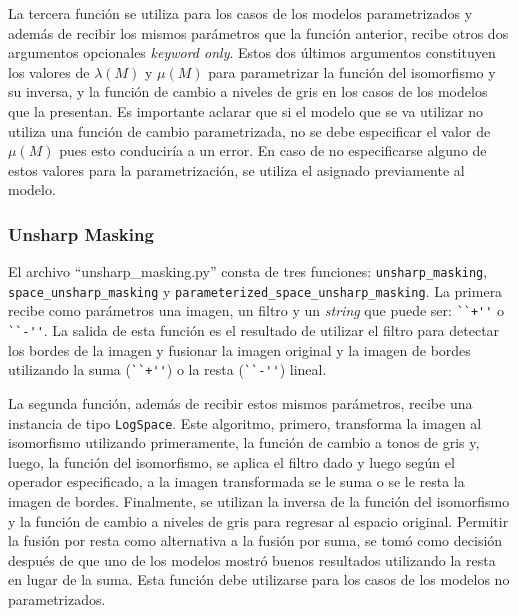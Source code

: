La tercera funci\'on se utiliza para los casos de los modelos parametrizados y adem\'as de recibir los mismos par\'ametros que la funci\'on anterior, recibe otros dos argumentos opcionales \textit{keyword only}. Estos dos \'ultimos argumentos constituyen los valores de $\lambda(M)$ y $\mu(M)$ para parametrizar la funci\'on del isomorfismo y su inversa, y la funci\'on de cambio a niveles de gris en los casos de los modelos que la presentan. Es importante aclarar que si el modelo que se va utilizar no utiliza una funci\'on de cambio parametrizada, no se debe especificar el valor de $\mu(M)$ pues esto conducir\'ia a un error.  En caso de no especificarse alguno de estos valores para la parametrizaci\'on, se utiliza el asignado previamente al modelo.

\subsubsection{Unsharp Masking}

El archivo ``unsharp\_masking.py'' consta de tres funciones: \verb|unsharp_masking|, \verb|space_unsharp_masking| y \verb|parameterized_space_unsharp_masking|. La primera recibe como par\'ametros una imagen, un filtro y un \textit{string} que puede ser: \verb|``+''| o \verb|``-''|. La salida de esta funci\'on es el resultado de utilizar el filtro para detectar los bordes de la imagen y fusionar la imagen original y la imagen de bordes utilizando la suma (\verb|``+''|) o la resta (\verb|``-''|) lineal. 

La segunda funci\'on, adem\'as de recibir estos mismos par\'ametros, recibe una instancia de tipo \verb|LogSpace|. Este algoritmo, primero, transforma la imagen al isomorfismo utilizando primeramente, la funci\'on de cambio a tonos de gris y, luego, la funci\'on del isomorfismo, se aplica el filtro dado y luego seg\'un el operador especificado, a la imagen transformada se le suma o se le resta la imagen de bordes. Finalmente, se utilizan la inversa de la funci\'on del isomorfismo y la funci\'on de cambio a niveles de gris para regresar al espacio original. Permitir la fusi\'on por resta como alternativa a la fusi\'on por suma, se tom\'o como decisi\'on despu\'es de que uno de los modelos mostr\'o buenos resultados utilizando la resta en lugar de la suma. Esta funci\'on debe utilizarse para los casos de los modelos no parametrizados.

